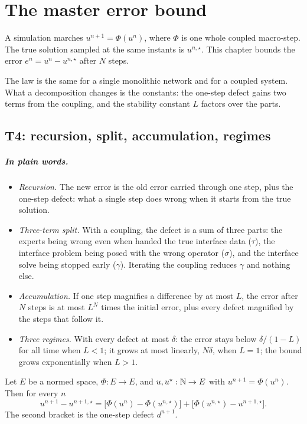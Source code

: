 \chapter{The master error bound}

A simulation marches $u^{n+1}=\Phi(u^n)$, where $\Phi$ is one whole coupled
macro-step.  The true solution sampled at the same instants is $u^{n,\star}$.
This chapter bounds the error $e^n=u^n-u^{n,\star}$ after $N$ steps.

The law is the same for a single monolithic network and for a coupled system.
What a decomposition changes is the constants: the one-step defect gains two
terms from the coupling, and the stability constant $L$ factors over the parts.

\section{T4: recursion, split, accumulation, regimes}

\paragraph{In plain words.}
\begin{itemize}
  \item \emph{Recursion.}  The new error is the old error carried through one
    step, plus the one-step defect: what a single step does wrong when it starts
    from the true solution.
  \item \emph{Three-term split.}  With a coupling, the defect is a sum of three
    parts: the experts being wrong even when handed the true interface data
    ($\tau$), the interface problem being posed with the wrong operator
    ($\sigma$), and the interface solve being stopped early ($\gamma$).
    Iterating the coupling reduces $\gamma$ and nothing else.
  \item \emph{Accumulation.}  If one step magnifies a difference by at most $L$,
    the error after $N$ steps is at most $L^N$ times the initial error, plus
    every defect magnified by the steps that follow it.
  \item \emph{Three regimes.}  With every defect at most $\delta$: the error
    stays below $\delta/(1-L)$ for all time when $L<1$; it grows at most
    linearly, $N\delta$, when $L=1$; the bound grows exponentially when $L>1$.
\end{itemize}

\begin{lemma}\label{lem:T4-recursion}
  \leanok
  Let $E$ be a normed space, $\Phi:E\to E$, and $u,u^\star:\mathbb{N}\to E$ with
  $u^{n+1}=\Phi(u^n)$.  Then for every $n$
  \[
    u^{n+1}-u^{n+1,\star}
      =\bigl[\Phi(u^n)-\Phi(u^{n,\star})\bigr]
      +\bigl[\Phi(u^{n,\star})-u^{n+1,\star}\bigr].
  \]
  The second bracket is the one-step defect $d^{n+1}$.
\end{lemma}

